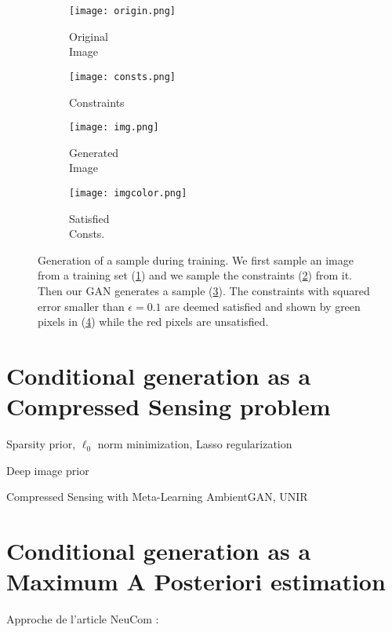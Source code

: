\begin{figure}[t]
\centering
\begin{subfigure}[t]{0.25\textwidth}
	\centering
	\texttt{[image: origin.png]}
	\caption{Original\\Image}
	\label{fig:original_shoe}
\end{subfigure}\begin{subfigure}[t]{0.25\textwidth}
	\centering
	\texttt{[image: consts.png]}
	\caption{Constraints}
	\label{fig:constraints}
\end{subfigure}\begin{subfigure}[t]{0.25\textwidth}
	\centering
	\texttt{[image: img.png]}
	\caption{Generated\\Image}
	\label{fig:pixelwise}
\end{subfigure}\begin{subfigure}[t]{0.24\textwidth}
	\centering
	\texttt{[image: imgcolor.png]}
	\caption{Satisfied\\Consts.}
	\label{fig:generated}
\end{subfigure}
\caption[Generation of a sample during training]{Generation of a sample during training. We first sample an image from a training set (\ref{fig:original_shoe}) and we sample the constraints (\ref{fig:constraints}) from it. Then our GAN generates a sample (\ref{fig:pixelwise}). The constraints with squared error smaller than $\epsilon=0.1$ are deemed satisfied and shown by green pixels in (\ref{fig:generated}) while the red pixels are unsatisfied.}
\label{fig:image_completion}
\end{figure}



\section{Conditional generation as a Compressed Sensing problem}

Sparsity prior, $\ell_0$ norm minimization, Lasso regularization

Deep image prior


 Compressed Sensing with Meta-Learning
 AmbientGAN, UNIR
 
\section{Conditional generation as a Maximum A  Posteriori estimation}
Approche de l'article NeuCom :

